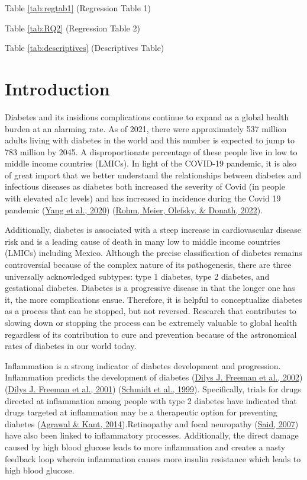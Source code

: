 \documentclass[
  man]{apa6}
\begin{document}
Table \ref{tab:regtab1} (Regression Table 1)

Table \ref{tab:RQ2} (Regression Table 2)

Table \ref{tab:descriptives} (Descriptives Table)

\hypertarget{introduction}{%
\section{Introduction}\label{introduction}}

Diabetes and its insidious complications continue to expand as a global health burden at an alarming rate. As of 2021, there were approximately 537 million adults living with diabetes in the world and this number is expected to jump to 783 million by 2045. A disproportionate percentage of these people live in low to middle income countries (LMICs). In light of the COVID-19 pandemic, it is also of great import that we better understand the relationships between diabetes and infectious diseases as diabetes both increased the severity of Covid (in people with elevated a1c levels) and has increased in incidence during the Covid 19 pandemic (\protect\hyperlink{ref-yangPrevalenceComorbiditiesIts2020}{Yang et al., 2020}) (\protect\hyperlink{ref-rohmInflammationObesityDiabetes2022}{Rohm, Meier, Olefsky, \& Donath, 2022}).

Additionally, diabetes is associated with a steep increase in cardiovascular disease risk and is a leading cause of death in many low to middle income countries (LMICs) including Mexico. Although the precise classification of diabetes remains controversial because of the complex nature of its pathogenesis, there are three universally acknowledged subtypes: type 1 diabetes, type 2 diabetes, and gestational diabetes. Diabetes is a progressive disease in that the longer one has it, the more complications ensue. Therefore, it is helpful to conceptualize diabetes as a process that can be stopped, but not reversed. Research that contributes to slowing down or stopping the process can be extremely valuable to global health regardless of its contribution to cure and prevention because of the astronomical rates of diabetes in our world today.

Inflammation is a strong indicator of diabetes development and progression. Inflammation predicts the development of diabetes (\protect\hyperlink{ref-freemanCreactiveProteinIndependent2002}{Dilys J. Freeman et al., 2002}) (\protect\hyperlink{ref-10.1161ux2f01.cir.103.3.357}{Dilys J. Freeman et al., 2001}) (\protect\hyperlink{ref-schmidtMarkersInflammationPrediction1999}{Schmidt et al., 1999}). Specifically, trials for drugs directed at inflammation among people with type 2 diabetes have indicated that drugs targeted at inflammation may be a therapeutic option for preventing diabetes (\protect\hyperlink{ref-10.4239ux2fwjd.v5.i5.697}{Agrawal \& Kant, 2014}).Retinopathy and focal neuropathy (\protect\hyperlink{ref-saidDiabeticNeuropathyReview2007}{Said, 2007}) have also been linked to inflammatory processes. Additionally, the direct damage caused by high blood glucose leads to more inflammation and creates a nasty feedback loop wherein inflammation causes more insulin resistance which leads to high blood glucose.
\end{document}
